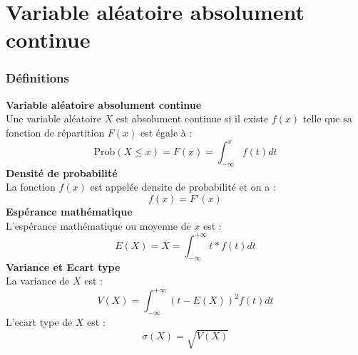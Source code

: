 \documentclass[a4paper,11pt]{book}
\begin{document}
\section{Variable al\'eatoire absolument continue}
\subsubsection{D\'efinitions}
{\bf Variable al\'eatoire absolument continue}\\
Une variable al\'eatoire $X$ est absolument continue si il existe $f(x)$ telle 
que sa fonction de r\'epartition $F(x)$ est \'egale \`a :
$$\mbox{Prob}(X\leq x)=F(x)=\int_{-\infty}^x f(t)dt$$
{\bf Densit\'e de probabilit\'e}\\
La fonction $f(x)$ est appel\'ee densite de probabilit\'e et on a :
$$f(x)=F'(x)$$
{\bf Esp\'erance math\'ematique}\\
L'esp\'erance math\'ematique ou moyenne de $x$ est :
$$E(X)=\overline{X}=\int_{-\infty}^{+\infty}t*f(t)dt$$
{\bf Variance et Ecart type}\\
La variance de $X$ est :
$$V(X)=\int_{-\infty}^{+\infty}(t-E(X))^2f(t)dt$$
L'ecart type de $X$ est :
$$\sigma(X)=\sqrt{V(X)}$$
\end{document}
